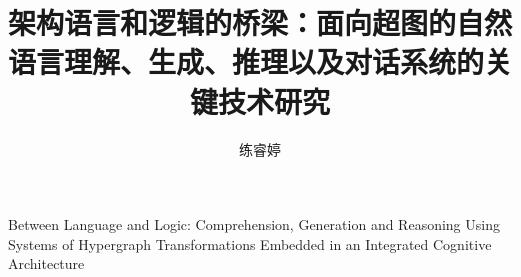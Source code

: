 \author{练睿婷}
\title{架构语言和逻辑的桥梁：面向超图的自然语言理解、生成、推理以及对话系统的关键技术研究}
{Between Language and Logic: Comprehension, Generation and Reasoning Using Systems of Hypergraph Transformations Embedded in an Integrated Cognitive Architecture}
\chairman{        }
\grantdate{  }{  }
\appraiser{       }

\team{   }
\fundteam{   }

